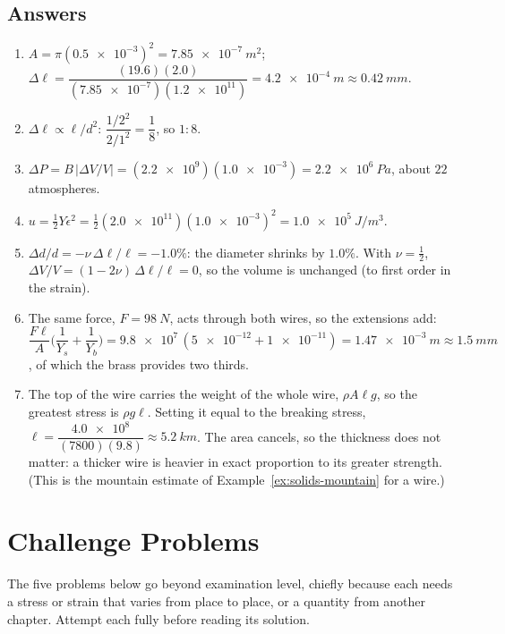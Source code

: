 \subsection*{Answers}
{\small
\begin{enumerate}[itemsep=2pt]
\item $A=\pi(\num{0.5e-3})^{2}=\SI{7.85e-7}{m^2}$; $\Delta\ell=\dfrac{(19.6)(2.0)}{(\num{7.85e-7})(\num{1.2e11})}
      =\SI{4.2e-4}{m}\approx\SI{0.42}{mm}$.
\item $\Delta\ell\propto\ell/d^{2}$: $\dfrac{1/2^{2}}{2/1^{2}}=\dfrac18$, so $1:8$.
\item $\Delta P=B\,|\Delta V/V|=(\num{2.2e9})(\num{1.0e-3})=\SI{2.2e6}{Pa}$, about $22$ atmospheres.
\item $u=\tfrac12Y\epsilon^{2}=\tfrac12(\num{2.0e11})(\num{1.0e-3})^{2}=\SI{1.0e5}{J/m^3}$.
\item $\Delta d/d=-\nu\,\Delta\ell/\ell=-1.0\%$: the diameter shrinks by $1.0\%$. With $\nu=\tfrac12$,
      $\Delta V/V=(1-2\nu)\,\Delta\ell/\ell=0$, so the volume is unchanged (to first order in the strain).
\item The same force, $F=\SI{98}{N}$, acts through both wires, so the extensions add:
      $\dfrac{F\ell}{A}\Big(\dfrac1{Y_s}+\dfrac1{Y_b}\Big)=\num{9.8e7}\,(\num{5e-12}+\num{1e-11})
      =\SI{1.47e-3}{m}\approx\SI{1.5}{mm}$, of which the brass provides two thirds.
\item The top of the wire carries the weight of the whole wire, $\rho A\ell g$, so the greatest stress is
      $\rho g\ell$. Setting it equal to the breaking stress, $\ell=\dfrac{\num{4.0e8}}{(7800)(9.8)}
      \approx\SI{5.2}{km}$. The area cancels, so the thickness does not matter: a thicker wire is heavier in
      exact proportion to its greater strength. (This is the mountain estimate of
      Example~\ref{ex:solids-mountain} for a wire.)
\end{enumerate}
}

\section{Challenge Problems}\label{sec:challenge-solids}

The five problems below go beyond examination level, chiefly because each needs a stress or strain that
varies from place to place, or a quantity from another chapter. Attempt each fully before reading its
solution.

